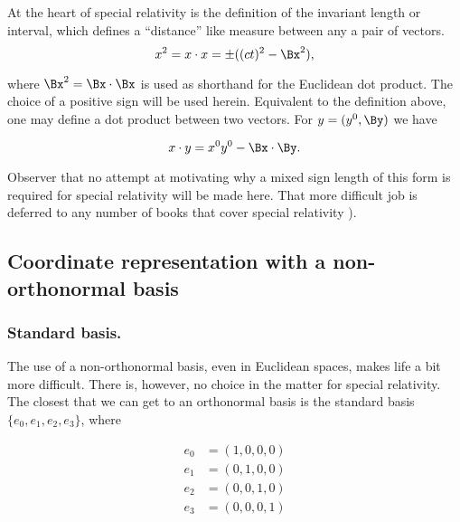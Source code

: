 At the heart of special relativity is the definition of the invariant length or interval, which defines a ``distance'' like measure between any a pair of vectors.
%
%
\begin{equation}\label{eqn:grahamSchmidtLorentz:30}
x^2 = x \cdot x = \pm ((c t)^2 - \Bx^2),
\end{equation}

where $\Bx^2 = \Bx \cdot \Bx$ is used as shorthand for the Euclidean dot product.  The choice of a positive sign will be used herein.  Equivalent to the definition above, one may define a dot product between two vectors.  For $y = (y^0, \By)$ we have

\begin{equation}\label{eqn:grahamSchmidtLorentz:50}
x \cdot y = x^0 y^0 - \Bx \cdot \By.
\end{equation}

Observer that no attempt at motivating why a mixed sign length of this form is required for special relativity will be made here.  That more difficult job is deferred to any number of books that cover special relativity \citep{landau1980classical}).

\subsection{Coordinate representation with a non-orthonormal basis}

\subsubsection{Standard basis.}

The use of a non-orthonormal basis, even in Euclidean spaces, makes life a bit more difficult.  There is, however, no choice in the matter for special relativity.  The closest that we can get to an orthonormal basis is the standard basis $\{e_0, e_1, e_2, e_3\}$, where

\begin{equation}\label{eqn:grahamSchmidtLorentz:70}
\begin{aligned}
e_0 &= (1, 0, 0, 0) \\
e_1 &= (0, 1, 0, 0) \\
e_2 &= (0, 0, 1, 0) \\
e_3 &= (0, 0, 0, 1)
\end{aligned}
\end{equation}

